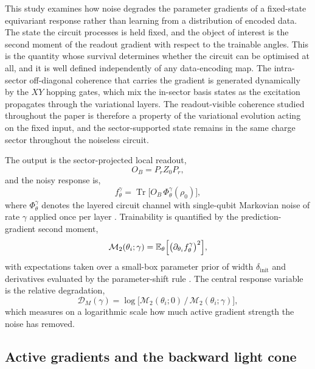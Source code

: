 \documentclass{article}
\newcommand{\Mtwo}{\mathcal{M}_2}
\newcommand{\DM}{\mathcal{D}_M}
\newcommand{\Tr}{\operatorname{Tr}}
\begin{document}
This study examines how noise degrades the parameter gradients of a fixed-state equivariant response rather than learning from a distribution of encoded data. The state the circuit processes is held fixed, and the object of interest is the second moment of the readout gradient with respect to the trainable angles. This is the quantity whose survival determines whether the circuit can be optimised at all, and it is well defined independently of any data-encoding map. The intra-sector off-diagonal coherence that carries the gradient is generated dynamically by the $XY$ hopping gates, which mix the in-sector basis states as the excitation propagates through the variational layers. The readout-visible coherence studied throughout the paper is therefore a property of the variational evolution acting on the fixed input, and the sector-supported state remains in the same charge sector throughout the noiseless circuit.

The output is the sector-projected local readout,
\begin{equation}
    O_B = P_r Z_0 P_r ,
    \label{eq:readout}
\end{equation}
and the noisy response is,
\begin{equation}
    f^\gamma_\theta=\Tr\!\bigl[O_B\,\Phi^\gamma_\theta(\rho_0)\bigr],
    \label{eq:prediction}
\end{equation}
where $\Phi^\gamma_\theta$ denotes the layered circuit channel with single-qubit Markovian noise of rate $\gamma$ applied once per layer \cite{lindblad1976,gks1976,breuerpetruccione2002}. Trainability is quantified by the prediction-gradient second moment,
\begin{equation}
    \Mtwo(\theta_i;\gamma)
    =
    \mathbb{E}_{\theta}
    \Bigl[\bigl(\partial_{\theta_i}f^\gamma_\theta\bigr)^2\Bigr],
    \label{eq:m2pred}
\end{equation}
with expectations taken over a small-box parameter prior of width $\delta_{\mathrm{init}}$ \cite{grant2019} and derivatives evaluated by the parameter-shift rule \cite{mitarai2018,schuld2019,wierichs2022}. The central response variable is the relative degradation,
\begin{equation}
    \DM(\gamma)
    =
    \log\!\bigl[\Mtwo(\theta_i;0)\,/\,\Mtwo(\theta_i;\gamma)\bigr],
    \label{eq:dm}
\end{equation}
which measures on a logarithmic scale how much active gradient strength the noise has removed.

\subsection{Active gradients and the backward light cone}\label{sec:lightcone}
\end{document}
